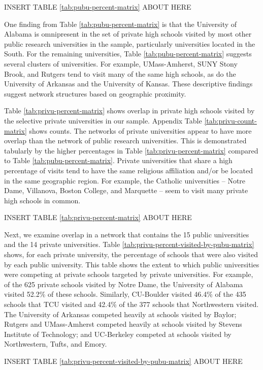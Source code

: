 \documentclass[
  12pt,
]{article}
\begin{document}
INSERT TABLE \ref{tab:pubu-percent-matrix} ABOUT HERE

One finding from Table \ref{tab:pubu-percent-matrix} is that the University of Alabama is omnipresent in the set of private high schools visited by most other public research universities in the sample, particularly universities located in the South. For the remaining universities, Table \ref{tab:pubu-percent-matrix} suggests several clusters of universities. For example, UMass-Amherst, SUNY Stony Brook, and Rutgers tend to visit many of the same high schools, as do the University of Arkansas and the University of Kansas. These descriptive findings suggest network structures based on geographic proximity.

Table \ref{tab:privu-percent-matrix} shows overlap in private high schools visited by the selective private universities in our sample. Appendix Table \ref{tab:privu-count-matrix} shows counts. The networks of private universities appear to have more overlap than the network of public research universities. This is demonstrated tabularly by the higher percentages in Table \ref{tab:privu-percent-matrix} compared to Table \ref{tab:pubu-percent-matrix}. Private universities that share a high percentage of visits tend to have the same religious affiliation and/or be located in the same geographic region. For example, the Catholic universities -- Notre Dame, Villanova, Boston College, and Marquette -- seem to visit many private high schools in common.

INSERT TABLE \ref{tab:privu-percent-matrix} ABOUT HERE

Next, we examine overlap in a network that contains the 15 public universities and the 14 private universities. Table \ref{tab:privu-percent-visited-by-pubu-matrix} shows, for each private university, the percentage of schools that were also visited by each public university. This table shows the extent to which public universities were competing at private schools targeted by private universities. For example, of the 625 private schools visited by Notre Dame, the University of Alabama visited 52.2\% of these schools. Similarly, CU-Boulder visited 46.4\% of the 435 schools that TCU visited and 42.4\% of the 377 schools that Northwestern visited. The University of Arkansas competed heavily at schools visited by Baylor; Rutgers and UMass-Amherst competed heavily at schools visited by Stevens Institute of Technology; and UC-Berkeley competed at schools visited by Northwestern, Tufts, and Emory.

INSERT TABLE \ref{tab:privu-percent-visited-by-pubu-matrix} ABOUT HERE
\end{document}
